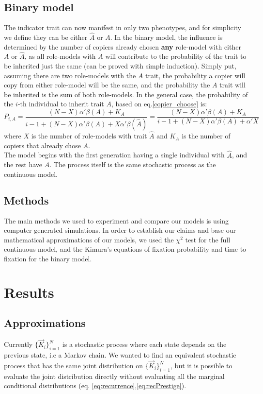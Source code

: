 \documentclass[11pt]{article}
\begin{document}
\subsection{Binary model} The indicator trait can now manifest in only two phenotypes, and for simplicity we define they can be either $\hat{A}$ or $A$. In the binary model, the influence is determined by the number of copiers already chosen \textbf{any} role-model with either $A$ or $\hat{A}$, as all role-models with $A$ will contribute to the probability of the trait to be inherited just the same (can be proved with simple induction). Simply put, assuming there are two role-models with the $A$ trait, the probability a copier will copy from either role-model will be the same, and the probability the $A$ trait will be inherited is the sum of both role-models.
In the general case, the probability of the $i$-th individual to inherit trait $A$, based on eq.\ref{copier_choose} is:
\begin{equation}\label{eq:binary-model}
P_{i,A} = \frac{(N-X)\alpha'\beta(A) + K_A}{i-1 + (N-X)\alpha'\beta(A) + X\alpha'\beta(\hat{A})} = \frac{(N-X)\alpha'\beta(A) + K_A}{i-1 + (N-X)\alpha'\beta(A) + \alpha'X}
\end{equation}
where $X$ is the number of role-models with trait $\hat{A}$ and $K_A$ is the number of copiers that already chose $A$.\\
The model begins with the first generation having a single individual with $\hat{A}$, and the rest have $A$. The process itself is the same stochastic process as the continuous model.

\subsection{Methods}
The main methods we used to experiment and compare our models is using computer generated simulations. In order to establish our claims and base our mathematical approximations of our models, we used the $\chi^2$ test for the full continuous model, and the Kimura's equations of fixation probability and time to fixation for the binary model.

\section{Results}
\subsection{Approximations}
Currently $\big\{\vec{K}_i\big\}_{i=1}^N$ is a stochastic process where each state depends on the previous state, i.e a Markov chain.
We wanted to find an equivalent stochastic process that has the same joint distribution on $\big\{\vec{K}_i\big\}_{i=1}^N$, but it is possible to evaluate the joint distribution directly without evaluating all the marginal conditional distributions (eq. \ref{eq:recurrence},\ref{eq:recPrestige}).
\end{document}
